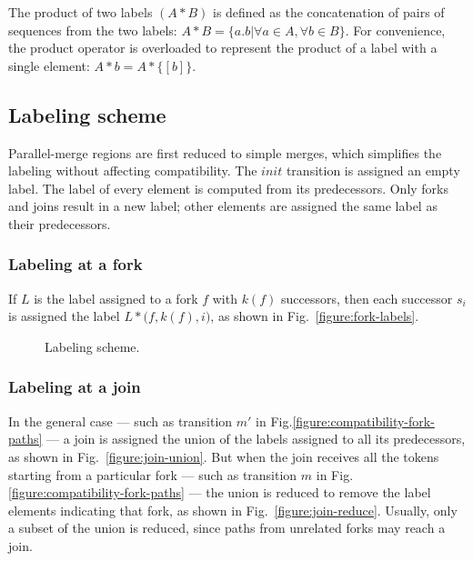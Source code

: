 \documentclass[conference]{IEEEtran}
\begin{document}
The product of two labels $(A * B)$ is
defined as the concatenation of pairs of sequences from the two
labels: $A*B = \{a.b |\forall a \in A, \forall b \in B \}$. For
convenience, the product operator is overloaded to represent the
product of a label with a single element: $A*b = A*\{[b]\}$.

\subsection{Labeling scheme}

Parallel-merge regions are first reduced to simple merges, which
simplifies the labeling without affecting compatibility. The $init$
transition is assigned an empty label. The label of every element is
computed from its predecessors. Only forks and joins result in a new
label; other elements are assigned the same label as their
predecessors.

\subsubsection{Labeling at a fork}

If $L$ is the label assigned to a fork $f$ with $k(f)$ successors,
then each successor $s_i$ is assigned the label $L *
\bigl(f,k(f),i\bigr)$, as shown in Fig.~\ref{figure:fork-labels}.

\begin{figure}[!t]
  \centering
  \caption{Labeling scheme.}
\end{figure}

\subsubsection{Labeling at a join}

In the general case --- such as transition $m'$ in
Fig.\ref{figure:compatibility-fork-paths} --- a join is assigned the
union of the labels assigned to all its predecessors, as shown in
Fig.~\ref{figure:join-union}. But when the join receives all the
tokens starting from a particular fork --- such as transition $m$ in
Fig.\ref{figure:compatibility-fork-paths} --- the union is reduced to
remove the label elements indicating that fork, as shown in
Fig.~\ref{figure:join-reduce}. Usually, only a subset of the union is
reduced, since paths from unrelated forks may reach a join.
\end{document}
